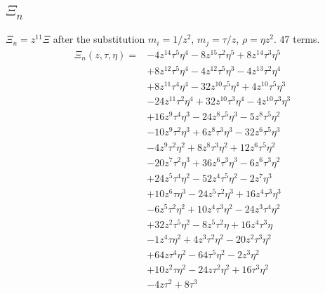 \subsection*{$\Xi_n$}
$\Xi_n=z^{11}\Xi$ after the substitution $m_i=1/z^2$, $m_j=\tau/z$, $\rho=\eta z^2$. 47 terms.
{\small
\begin{align*}
\Xi_n(z,\tau,\eta)={}&-4z^{14}\tau^{5}\eta^{4}-8z^{15}\tau^{2}\eta^{5}+8z^{14}\tau^{3}\eta^{5}\\
&+8z^{12}\tau^{5}\eta^{4}-4z^{12}\tau^{5}\eta^{3}-4z^{13}\tau^{2}\eta^{4}\\
&+8z^{11}\tau^{4}\eta^{4}-32z^{10}\tau^{5}\eta^{4}+4z^{10}\tau^{5}\eta^{3}\\
&-24z^{11}\tau^{2}\eta^{4}+32z^{10}\tau^{3}\eta^{4}-4z^{10}\tau^{3}\eta^{3}\\
&+16z^{9}\tau^{4}\eta^{3}-24z^{8}\tau^{5}\eta^{3}-5z^{8}\tau^{5}\eta^{2}\\
&-10z^{9}\tau^{2}\eta^{3}+6z^{8}\tau^{3}\eta^{3}-32z^{6}\tau^{5}\eta^{3}\\
&-4z^{9}\tau^{2}\eta^{2}+8z^{8}\tau^{3}\eta^{2}+12z^{6}\tau^{5}\eta^{2}\\
&-20z^{7}\tau^{2}\eta^{3}+36z^{6}\tau^{3}\eta^{3}-6z^{6}\tau^{3}\eta^{2}\\
&+24z^{5}\tau^{4}\eta^{2}-52z^{4}\tau^{5}\eta^{2}-2z^{7}\eta^{3}\\
&+10z^{6}\tau\eta^{3}-24z^{5}\tau^{2}\eta^{3}+16z^{4}\tau^{3}\eta^{3}\\
&-6z^{5}\tau^{2}\eta^{2}+10z^{4}\tau^{3}\eta^{2}-24z^{3}\tau^{4}\eta^{2}\\
&+32z^{2}\tau^{5}\eta^{2}-8z^{5}\tau^{2}\eta+16z^{4}\tau^{3}\eta\\
&-1z^{4}\tau\eta^{2}+4z^{3}\tau^{2}\eta^{2}-20z^{2}\tau^{3}\eta^{2}\\
&+64z\tau^{4}\eta^{2}-64\tau^{5}\eta^{2}-2z^{3}\eta^{2}\\
&+10z^{2}\tau\eta^{2}-24z\tau^{2}\eta^{2}+16\tau^{3}\eta^{2}\\
&-4z\tau^{2}+8\tau^{3}
\end{align*}
}

